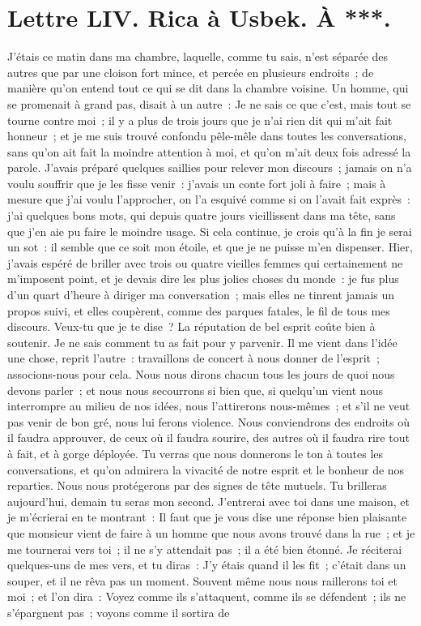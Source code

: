 \documentclass[french,twoside]{book} %
\newcommand{\dateline}[1]{\medskip{\RaggedLeft{#1}\par}\bigskip}
\begin{document}
\dateline{Du sérail d’Ispahan, le 5 de la lune de Chalval, 1713.}
\section[{Lettre LIV. Rica à Usbek. À ***.}]{Lettre LIV. Rica à Usbek. À ***.}\renewcommand{\leftmark}{Lettre LIV. Rica à Usbek. À ***.}

\noindent J’étais ce matin dans ma chambre, laquelle, comme tu sais, n’est séparée des autres que par une cloison fort mince, et percée en plusieurs endroits ; de manière qu’on entend tout ce qui se dit dans la chambre voisine. Un homme, qui se promenait à grand pas, disait à un autre : Je ne sais ce que c’est, mais tout se tourne contre moi ; il y a plus de trois jours que je n’ai rien dit qui m’ait fait honneur ; et je me suis trouvé confondu pêle-mêle dans toutes les conversations, sans qu’on ait fait la moindre attention à moi, et qu’on m’ait deux fois adressé la parole. J’avais préparé quelques saillies pour relever mon discours ; jamais on n’a voulu souffrir que je les fisse venir : j’avais un conte fort joli à faire ; mais à mesure que j’ai voulu l’approcher, on l’a esquivé comme si on l’avait fait exprès : j’ai quelques bons mots, qui depuis quatre jours vieillissent dans ma tête, sans que j’en aie pu faire le moindre usage. Si cela continue, je crois qu’à la fin je serai un sot : il semble que ce soit mon étoile, et que je ne puisse m’en dispenser. Hier, j’avais espéré de briller avec trois ou quatre vieilles femmes qui certainement ne m’imposent point, et je devais dire les plus jolies choses du monde : je fus plus d’un quart d’heure à diriger ma conversation ; mais elles ne tinrent jamais un propos suivi, et elles coupèrent, comme des parques fatales, le fil de tous mes discours. Veux-tu que je te dise ? La réputation de bel esprit coûte bien à soutenir. Je ne sais comment tu as fait pour y parvenir. Il me vient dans l’idée une chose, reprit l’autre : travaillons de concert à nous donner de l’esprit ; associons-nous pour cela. Nous nous dirons chacun tous les jours de quoi nous devons parler ; et nous nous secourrons si bien que, si quelqu’un vient nous interrompre au milieu de nos idées, nous l’attirerons nous-mêmes ; et s’il ne veut pas venir de bon gré, nous lui ferons violence. Nous conviendrons des endroits où il faudra approuver, de ceux où il faudra sourire, des autres où il faudra rire tout à fait, et à gorge déployée. Tu verras que nous donnerons le ton à toutes les conversations, et qu’on admirera la vivacité de notre esprit et le bonheur de nos reparties. Nous nous protégerons par des signes de tête mutuels. Tu brilleras aujourd’hui, demain tu seras mon second. J’entrerai avec toi dans une maison, et je m’écrierai en te montrant : Il faut que je vous dise une réponse bien plaisante que monsieur vient de faire à un homme que nous avons trouvé dans la rue ; et je me tournerai vers toi ; il ne s’y attendait pas ; il a été bien étonné. Je réciterai quelques-uns de mes vers, et tu diras : J’y étais quand il les fit ; c’était dans un souper, et il ne rêva pas un moment. Souvent même nous nous raillerons toi et moi ; et l’on dira : Voyez comme ils s’attaquent, comme ils se défendent ; ils ne s’épargnent pas ; voyons comme il sortira de 
\end{document}
